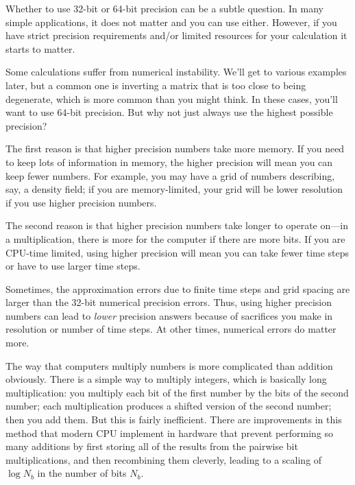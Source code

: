   
\begin{answer}
Whether to use 32-bit or 64-bit precision can be a subtle question. In
many simple applications, it does not matter and you can use
either. However, if you have strict precision requirements and/or
limited resources for your calculation it starts to matter.

Some calculations suffer from numerical instability. We'll get to
various examples later, but a common one is inverting a matrix that is
too close to being degenerate, which is more common than you might
think. In these cases, you'll want to use 64-bit precision. But why
not just always use the highest possible precision?

The first reason is that higher precision numbers take more memory. If
you need to keep lots of information in memory, the higher precision
will mean you can keep fewer numbers. For example, you may have a grid
of numbers describing, say, a density field; if you are
memory-limited, your grid will be lower resolution if you use higher
precision numbers.

The second reason is that higher precision numbers take longer to
operate on---in a multiplication, there is more for the computer if
there are more bits. If you are CPU-time limited, using higher
precision will mean you can take fewer time steps or have to use
larger time steps.

Sometimes, the approximation errors due to finite time steps and grid
spacing are larger than the 32-bit numerical precision errors. Thus,
using higher precision numbers can lead to {\it
lower} precision answers because of sacrifices you make in resolution
or number of time steps. At other times, numerical errors do matter
more. 
\end{answer}


The way that computers multiply numbers is more complicated than
addition obviously. There is a simple way to multiply integers, which
is basically long multiplication: you multiply each bit of the first
number by the bits of the second number; each multiplication produces
a shifted version of the second number; then you add them. But this is
fairly inefficient. There are improvements in this method that modern
CPU implement in hardware that prevent performing so many additions by
first storing all of the results from the pairwise bit
multiplications, and then recombining them cleverly, leading to a
scaling of $\log N_b$ in the number of bits $N_b$.


